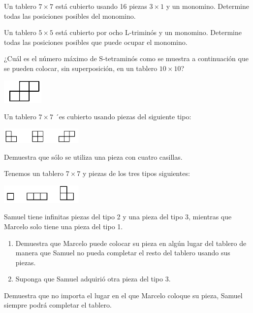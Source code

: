 \documentclass[11pt]{scrartcl}
\begin{document}
\begin{problem}
Un tablero $7 \times 7$ está cubierto usando 16 piezas $3 \times 1$ y un monomino. Determine todas las posiciones posibles del monomino.
\end{problem}

\begin{problem}[Estonia 2004] Un tablero $5 \times 5$ está cubierto por ocho L-triminós y un monomino. Determine todas las posiciones posibles que puede ocupar el monomino.
\end{problem}

\begin{problem}
¿Cuál es el número máximo de S-tetraminós como se muestra a continuación que se pueden colocar, sin superposición, en un tablero $10 \times 10$?
\begin{center}
    \includegraphics[width=2cm]{images/clase_09_S-tetramino.png}
\end{center}
\end{problem}

\begin{problem}
Un tablero \(7 \times 7\) ´es cubierto usando piezas del siguiente tipo:
\begin{center}
    \includegraphics[width=4cm]{images/clase_combi_centro_09_triminos_tetramino.png}
\end{center}
Demuestra que sólo se utiliza una pieza con cuatro casillas.
\end{problem}

\begin{problem}[Bielorrusia 1999] Tenemos un tablero $7 \times 7$ y piezas de los tres tipos siguientes:
\begin{center}
    \includegraphics[width=4cm]{images/clase_combi_centro_09_triminos_mono.png}
\end{center}
Samuel tiene infinitas piezas del tipo 2 y una pieza del tipo 3, mientras que Marcelo solo tiene una pieza del tipo 1.
\begin{enumerate}
    \item Demuestra que Marcelo puede colocar su pieza en algún lugar del tablero de manera que Samuel no pueda completar el resto del tablero usando sus piezas.
    \item Suponga que Samuel adquirió otra pieza del tipo 3.
\end{enumerate}
Demuestra que no importa el lugar en el que Marcelo coloque su pieza, Samuel siempre podrá completar el tablero.
\end{problem}
\end{document}
